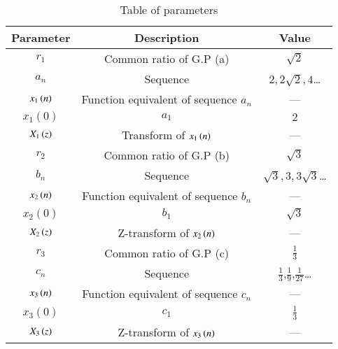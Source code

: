 \begin{table}[ht]
\renewcommand\thetable{1}
\begin{tabular}{|c|c|c|}
    \hline
    \textbf{Parameter}&\textbf{Description} &\textbf{Value}\\
    \hline
    $r_1$ & Common ratio of G.P (a) & $\sqrt{2}$ \\
    \hline
    $a_n$ & Sequence & $2,2\sqrt{2},4$\dots \\
    \hline
    $x_1\left(n\right)$ & Function equivalent of sequence $a_n$ & --- \\
    \hline
    $x_1(0)$ & $a_1$ & $2$ \\
    \hline 
    $X_1\left(z\right)$ & Transform of $x_1\left(n\right)$ & --- \\
    \hline
    $r_2$ & Common ratio of G.P (b) & $\sqrt{3}$ \\
    \hline
    $b_n$ & Sequence & $\sqrt{3}, 3, 3\sqrt{3}$\dots \\ 
    \hline
    $x_2\left(n\right)$ & Function equivalent of sequence $b_n$ & --- \\
    \hline 
    $x_2(0)$ & $b_1$ & $\sqrt{3}$ \\
    \hline
    $X_2\left(z\right)$ & Z-transform of $x_2\left(n\right)$ & --- \\
    \hline
    $r_3$ & Common ratio of G.P (c) & $\frac{1}{3}$\\
    \hline
    $c_n$ & Sequence & $\frac{1}{3}$,$\frac{1}{9}$,$\frac{1}{27}$\dots\\
    \hline
    $x_3\left(n\right)$ & Function equivalent of sequence $c_n$ & ---\\
    \hline 
    $x_3(0)$ & $c_1$ & $\frac{1}{3}$\\
    \hline
    $X_3\left(z\right)$ & Z-transform of $x_3\left(n\right)$ & ---\\ 
    \hline
\end{tabular}

\caption{Table of parameters}
\label{Table:1}
\end{table}